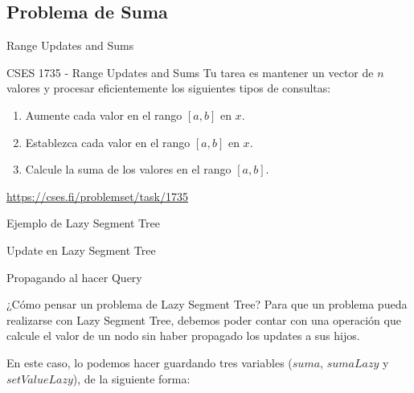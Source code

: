 \documentclass{beamer}
\begin{document}
\subsection{Problema de Suma}
\begin{frame}{Range Updates and Sums}
\begin{block}{CSES 1735 - Range Updates and Sums}
Tu tarea es mantener un vector de $n$ valores y procesar eficientemente los siguientes tipos de consultas:
\begin{enumerate}
    \item Aumente cada valor en el rango $[a,b]$ en $x$.
    \item Establezca cada valor en el rango $[a,b]$ en $x$.
    \item Calcule la suma de los valores en el rango $[a,b]$.
\end{enumerate}
\end{block}

\url{https://cses.fi/problemset/task/1735}
\end{frame}

\begin{frame}{Ejemplo de Lazy Segment Tree}

\end{frame}

\begin{frame}{Update en Lazy Segment Tree}

\end{frame}

\begin{frame}{Propagando al hacer Query}

\end{frame}

\begin{frame}{¿Cómo pensar un problema de Lazy Segment Tree?}
Para que un problema pueda realizarse con Lazy Segment Tree, debemos poder contar con una operación que calcule el valor de un nodo sin haber propagado los updates a sus hijos.

En este caso, lo podemos hacer guardando tres variables ($suma$, $sumaLazy$ y $setValueLazy$), de la siguiente forma:
\end{frame}
\end{document}
